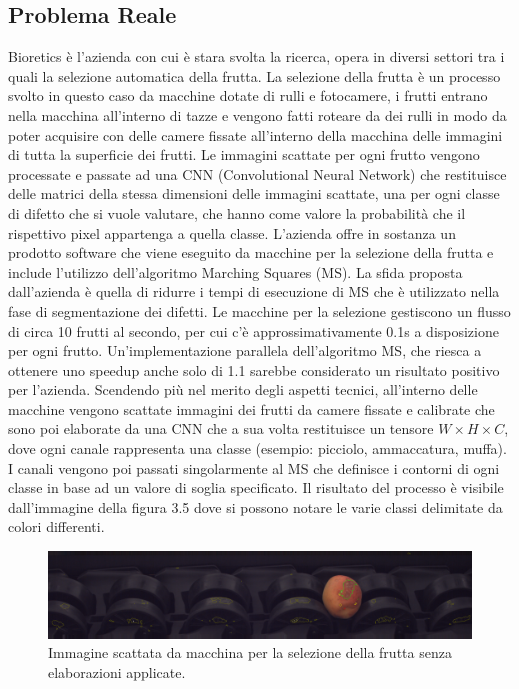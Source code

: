 \documentclass[12pt,a4paper]{report}
\begin{document}
\subsection{Problema Reale}
Bioretics è l'azienda con cui è stara svolta la ricerca, opera in diversi settori tra i quali la selezione automatica della frutta. La selezione della frutta è un processo svolto in questo caso da macchine dotate di rulli e fotocamere, i frutti entrano nella macchina all'interno di tazze e vengono fatti roteare da dei rulli in modo da poter acquisire con delle camere fissate all'interno della macchina delle immagini di tutta la superficie dei frutti. Le immagini scattate per ogni frutto vengono processate e passate ad una CNN (Convolutional Neural Network) che restituisce delle matrici della stessa dimensioni delle immagini scattate, una per ogni classe di difetto che si vuole valutare, che hanno come valore la probabilità che il rispettivo pixel appartenga a quella classe. \newline
L'azienda offre in sostanza un prodotto software che viene eseguito da macchine per la selezione della frutta e include l’utilizzo dell'algoritmo Marching Squares (MS). La sfida proposta dall'azienda è quella di ridurre i tempi di esecuzione di MS che è utilizzato nella fase di segmentazione dei difetti.
Le macchine per la selezione gestiscono un flusso di circa 10 frutti al secondo, per cui c'è approssimativamente 0.1s a disposizione per ogni frutto. Un’implementazione parallela dell’algoritmo MS, che riesca a ottenere uno speedup anche solo di 1.1 sarebbe considerato un risultato positivo per l’azienda.
Scendendo più nel merito degli aspetti tecnici, all’interno delle macchine vengono scattate immagini dei frutti da camere fissate e calibrate che sono poi elaborate da una CNN che a sua volta restituisce un tensore $W\times H\times C$, dove ogni canale rappresenta una classe (esempio: picciolo, ammaccatura, muffa).
I canali vengono poi passati singolarmente al MS che definisce i contorni di ogni classe in base ad un valore di soglia specificato. Il risultato del processo è visibile dall’immagine della figura 3.5 dove si possono notare le varie classi delimitate da colori differenti. \newline
\begin{figure}[H]
    \centering
    \includegraphics[scale=0.25]{img/marching_squares_00000052_00000001.png}
    \caption{Immagine scattata da macchina per la selezione della frutta senza elaborazioni applicate.}
\end{figure} 
\end{document}
